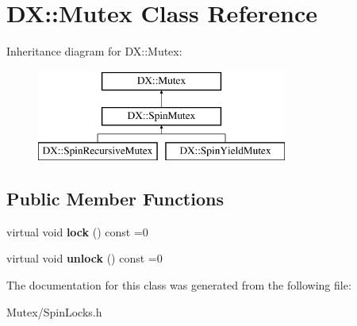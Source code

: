 \hypertarget{class_d_x_1_1_mutex}{\section{D\-X\-:\-:Mutex Class Reference}
\label{class_d_x_1_1_mutex}
}
Inheritance diagram for D\-X\-:\-:Mutex\-:\begin{figure}[H]
\begin{center}
\leavevmode
\includegraphics[height=3.000000cm]{class_d_x_1_1_mutex}
\end{center}
\end{figure}
\subsection*{Public Member Functions}
\begin{DoxyCompactItemize}
\item 
\hypertarget{class_d_x_1_1_mutex_aaac9b22f8b25c59db3e22eb1573fc4bf}{virtual void {\bfseries lock} () const =0}\label{class_d_x_1_1_mutex_aaac9b22f8b25c59db3e22eb1573fc4bf}

\item 
\hypertarget{class_d_x_1_1_mutex_a3e89a059beab053e852366a810298073}{virtual void {\bfseries unlock} () const =0}\label{class_d_x_1_1_mutex_a3e89a059beab053e852366a810298073}

\end{DoxyCompactItemize}


The documentation for this class was generated from the following file\-:\begin{DoxyCompactItemize}
\item 
Mutex/Spin\-Locks.\-h\end{DoxyCompactItemize}
